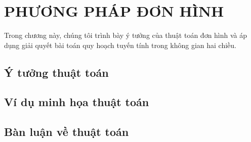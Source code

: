 \chapter{PHƯƠNG PHÁP ĐƠN HÌNH}

Trong chương này, chúng tôi trình bày ý tưởng của thuật toán đơn hình và áp dụng giải quyết bài toán quy hoạch tuyến tính trong không gian hai chiều.

\section{Ý tưởng thuật toán}


\section{Ví dụ minh họa thuật toán}


\section{Bàn luận về thuật toán}